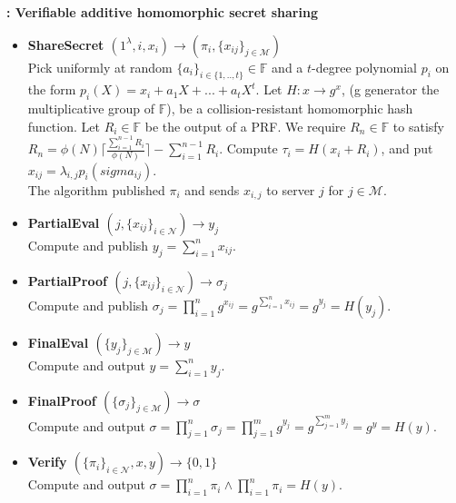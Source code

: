 \begin{algorithm}[H]
\caption{\textbf{: Verifiable additive homomorphic secret sharing}}
\begin{itemize}
  \item\textbf{ShareSecret $(1^\lambda,i,x_i)\xrightarrow[]{}(\pi_i,\{x_{ij}\}_{j\in\mathcal{M}})$}\\
Pick uniformly at random $\{a_i\}_{i\in\{1,..,t\}}\in\mathds{F}$ and a $t$-degree polynomial $p_i$ on the form $p_i(X) = x_i + a_1X+...+a_tX^t$. Let $H:x\to g^x$, (g generator the multiplicative group of $\mathds{F}$), be a collision-resistant homomorphic hash function. Let $R_i\in\mathds{F}$ be the output of a PRF. We require $R_n\in \mathds{F}$ to satisfy
$R_n = \phi(N)\lceil \frac{\sum_{i=1}^{n-1}R_i}{\phi(N)}\rceil- \sum_{i=1}^{n-1}R_i $. Compute $\tau_i = H(x_i+R_i)$, and put $x_{ij}=\lambda_{i,j}p_i(sigma_{ij})$. \\
The algorithm published $\pi_i$ and sends $x_{i,j}$ to server $j$ for $j\in\mathcal{M}$. 

\item\textbf{PartialEval $(j,\{x_{ij}\}_{i\in\mathcal{N}})\xrightarrow[]{}y_j$}\\
Compute and publish $y_j = \sum_{i=1}^n x_{ij}$.

\item\textbf{PartialProof $(j,\{x_{ij}\}_{i\in\mathcal{N}})\xrightarrow[]{}\sigma_j$}\\
Compute and publish $\sigma_j = \prod_{i=1}^n g^{x_{ij}} =  g^{\sum_{i=1}^n x_{ij}}= g^{y_j}=H(y_j)$.

\item\textbf{FinalEval $(\{y_j\}_{j\in\mathcal{M}})\xrightarrow[]{}y$}\\
Compute and output $y = \sum_{i=1}^n y_{j}$.

\item\textbf{FinalProof $(\{\sigma_j\}_{j\in\mathcal{M}})\xrightarrow[]{}\sigma$}\\
Compute and output $\sigma = \prod_{j=1}^n \sigma_j = \prod_{j=1}^m g^{y_{j}} =  g^{\sum_{j=1}^m y_{j}}= g^{y}=H(y)$.

\item\textbf{Verify $(\{\pi_i\}_{i\in\mathcal{N}},x,y)\xrightarrow[]{}\{0,1\}$}\\
Compute and output $\sigma= \prod_{i=1}^n \pi_i \wedge \prod_{i=1}^n \pi_i = H(y)$.
\end{itemize}
\label{alg:VAHSS-HSS}
\end{algorithm}


